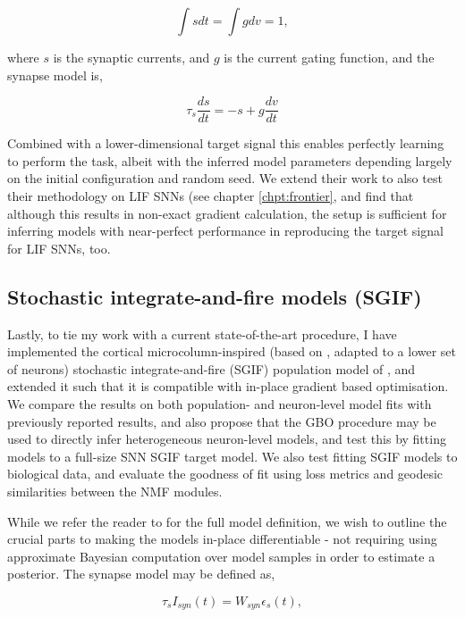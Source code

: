 \documentclass[mphil,deptreport,ianc]{infthesis} %
\begin{document}
\begin{equation}
    \int s dt = \int g dv = 1,
\end{equation}

where $s$ is the synaptic currents, and $g$ is the current gating function, and the synapse model is,

\begin{equation}
    \tau_s \frac{ds}{dt} = -s + g \frac{dv}{dt}
\end{equation}

Combined with a lower-dimensional target signal this enables perfectly learning to perform the task, albeit with the inferred model parameters depending largely on the initial configuration and random seed.
We extend their work to also test their methodology on LIF SNNs (see chapter \ref{chpt:frontier}, and find that although this results in non-exact gradient calculation, the setup is sufficient for inferring models with near-perfect performance in reproducing the target signal for LIF SNNs, too.

\subsection{Stochastic integrate-and-fire models (SGIF)}\label{microGIF}

Lastly, to tie my work with a current state-of-the-art procedure, I have implemented the cortical microcolumn-inspired (based on \cite{Schwalger2017}, adapted to a lower set of neurons) stochastic integrate-and-fire (SGIF) population model of \cite{Rene2020}, and extended it such that it is compatible with in-place gradient based optimisation. 
We compare the results on both population- and neuron-level model fits with previously reported results, and also propose that the GBO procedure may be used to directly infer heterogeneous neuron-level models, and test this by fitting models to a full-size SNN SGIF target model.
We also test fitting SGIF models to biological data, and evaluate the goodness of fit using loss metrics and geodesic similarities between the NMF modules.

While we refer the reader to \cite{Rene2020} for the full model definition, we wish to outline the crucial parts to making the models in-place differentiable - not requiring using approximate Bayesian computation over model samples in order to estimate a posterior.
The synapse model may be defined as,

\begin{equation}
    \tau_s I_{syn}(t) = W_{syn} \epsilon_s(t),
\end{equation}
\end{document}
